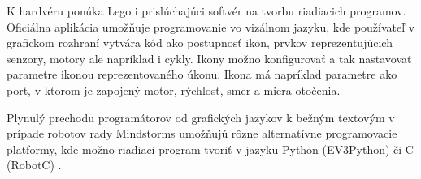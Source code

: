 K hardvéru ponúka Lego i prislúchajúci softvér na tvorbu riadiacich programov. Oficiálna aplikácia umožňuje programovanie vo vizálnom jazyku, kde používateľ v grafickom rozhraní vytvára kód ako postupnosť ikon, prvkov reprezentujúcich senzory, motory ale napríklad i cykly. Ikony možno konfigurovať a tak nastavovať parametre ikonou reprezentovaného úkonu. Ikona  má napríklad parametre ako port, v ktorom je zapojený motor, rýchlosť, smer a miera otočenia.

Plynulý prechodu programátorov od grafických jazykov k bežným textovým v prípade robotov rady Mindstorms umožňujú rôzne alternatívne programovacie platformy, kde možno riadiaci program tvoriť v jazyku Python (EV3Python) či C (RobotC) \cite{LegoAlternatives}.










